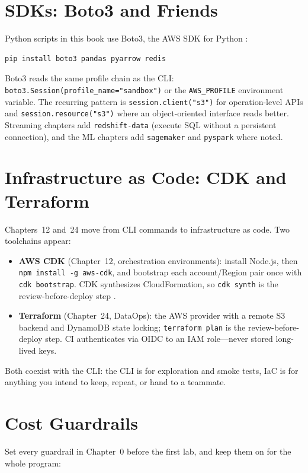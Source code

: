 \section{SDKs: Boto3 and Friends}
%
Python scripts in this book use Boto3, the AWS SDK for Python \cite{boto3UserGuide}:

\begin{lstlisting}[language=bash,caption={Installing the Python tooling used across chapters.},label={lst:app-setup-pip}]
pip install boto3 pandas pyarrow redis
\end{lstlisting}

Boto3 reads the same profile chain as the CLI: \texttt{boto3.Session(profile\_name="sandbox")} or
the \texttt{AWS\_PROFILE} environment variable. The recurring pattern is
\texttt{session.client("s3")} for operation-level APIs and
\texttt{session.resource("s3")} where an object-oriented interface reads better. Streaming
chapters add \texttt{redshift-data} (execute SQL without a persistent connection), and the ML
chapters add \texttt{sagemaker} and \texttt{pyspark} where noted.

\section{Infrastructure as Code: CDK and Terraform}
%
Chapters~12 and~24 move from CLI commands to infrastructure as code. Two toolchains appear:

\begin{itemize}
    \item \textbf{AWS CDK} (Chapter~12, orchestration environments): install Node.js, then
    \texttt{npm install -g aws-cdk}, and bootstrap each account/Region pair once with
    \texttt{cdk bootstrap}. CDK synthesizes CloudFormation, so \texttt{cdk synth} is the
    review-before-deploy step \cite{awsCDKDeveloperGuide}.
    \item \textbf{Terraform} (Chapter~24, DataOps): the AWS provider with a remote S3 backend and
    DynamoDB state locking; \texttt{terraform plan} is the review-before-deploy step. CI
    authenticates via OIDC to an IAM role---never stored long-lived keys.
\end{itemize}

Both coexist with the CLI: the CLI is for exploration and smoke tests, IaC is for anything you
intend to keep, repeat, or hand to a teammate.

\section{Cost Guardrails}
%
Set every guardrail in Chapter~0 before the first lab, and keep them on for the whole program:

